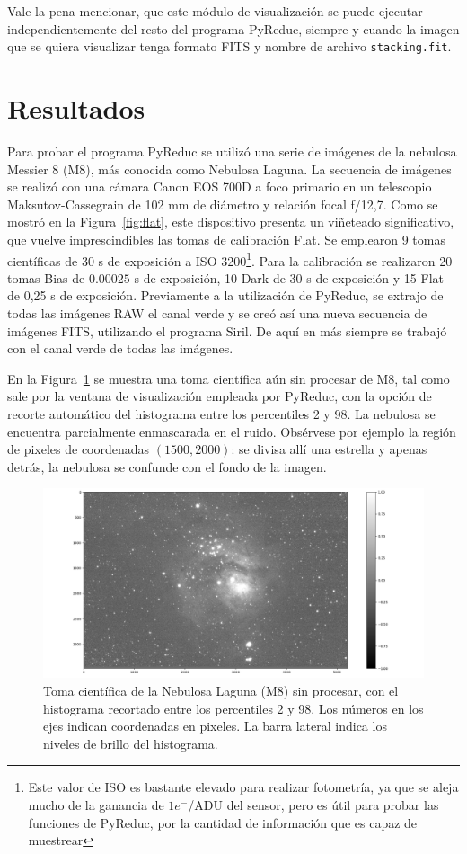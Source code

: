 \documentclass[a4paper, 12pt]{article}
\begin{document}
Vale la pena mencionar, que este módulo de visualización se puede ejecutar independientemente del resto del programa PyReduc, siempre y cuando la imagen que se quiera visualizar tenga formato FITS y nombre de archivo \texttt{stacking.fit}.

 
\section{Resultados}
Para probar el programa PyReduc se utilizó una serie de imágenes de la nebulosa Messier 8 (M8), más conocida como Nebulosa Laguna. La secuencia de imágenes se realizó con una cámara {\sf Canon EOS 700D} a foco primario en un telescopio Maksutov-Cassegrain de 102 mm de diámetro y relación focal f/12,7. Como se mostró en la Figura~\ref{fig:flat}, este dispositivo presenta un viñeteado significativo, que vuelve imprescindibles las tomas de calibración Flat. Se emplearon 9 tomas científicas de 30 s de exposición a ISO 3200\footnote{Este valor de ISO es bastante elevado para realizar fotometría, ya que se aleja mucho de la ganancia de $1 e^{-}$/ADU del sensor, pero es útil para probar las funciones de PyReduc, por la cantidad de información que es capaz de muestrear}. Para la calibración se realizaron 20 tomas Bias de $0.00025$ s de exposición, 10 Dark de 30 s de exposición y 15 Flat de 0,25 s de exposición. Previamente a la utilización de PyReduc, se extrajo de todas las imágenes RAW el canal verde y se creó así una nueva secuencia de imágenes FITS, utilizando el programa {\sf Siril}. De aquí en más siempre se trabajó con el canal verde de todas las imágenes.

En la Figura~\ref{fig:laguna0} se muestra una toma científica aún sin procesar de M8, tal como sale por la ventana de visualización empleada por PyReduc, con la opción de recorte automático del histograma entre los percentiles 2 y 98. La nebulosa se encuentra parcialmente enmascarada en el ruido. Obsérvese por ejemplo la región de pixeles de coordenadas $(1500, 2000)$: se divisa allí una estrella y apenas detrás, la nebulosa se confunde con el fondo de la imagen.

\begin{figure}[!h]
  \centering
  \includegraphics[width=\textwidth]{img/sin_proc.png}
  \caption{\label{fig:laguna0} Toma científica de la Nebulosa Laguna (M8) sin procesar, con el histograma recortado entre los percentiles 2 y 98. Los números en los ejes indican coordenadas en pixeles. La barra lateral indica los niveles de brillo del histograma.}
\end{figure}
\end{document}
